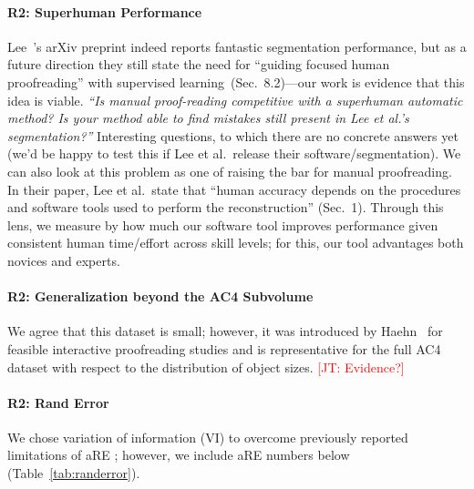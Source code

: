 \documentclass[10pt,twocolumn,letterpaper]{article}
\newcommand{\JT}[1]{\textcolor{red}{[JT: #1]}}
\begin{document}
\paragraph{R2: Superhuman Performance} Lee~\etal's arXiv preprint indeed reports fantastic segmentation performance, but as a future direction they still state the need for ``guiding focused human proofreading'' with supervised learning~(Sec.~8.2)---our work is evidence that this idea is viable. \newline \noindent \emph{``Is manual proof-reading competitive with a superhuman automatic method? Is your method able to find mistakes still present in Lee et al.'s segmentation?''} Interesting questions, to which there are no concrete answers yet (we'd be happy to test this if Lee et al.~release their software/segmentation). We can also look at this problem as one of raising the bar for manual proofreading. In their paper, Lee et al.~state that ``human accuracy depends on the procedures and software tools used to perform the reconstruction'' (Sec.~1). Through this lens, we measure by how much our software tool improves performance given consistent human time/effort across skill levels; for this, our tool advantages both novices and experts.


\paragraph{R2: Generalization beyond the AC4 Subvolume} We agree that this dataset is small; however, it was introduced by Haehn~ for feasible interactive proofreading studies and is representative for the full AC4 dataset with respect to the distribution of object sizes. \JT{Evidence?}

\paragraph{R2: Rand Error} We chose variation of information (VI) to overcome previously reported limitations of aRE \cite[p.~5]{NunezIglesias2013Machine}; however, we include aRE numbers below (Table~\ref{tab:randerror}).
\end{document}
